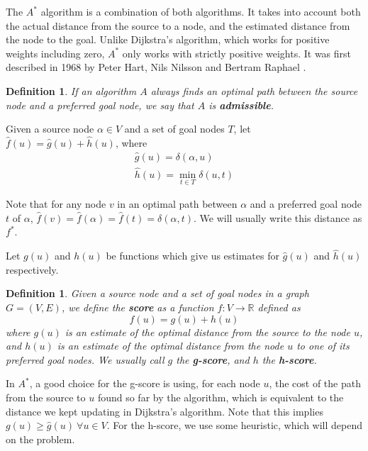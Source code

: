 \documentclass[a4paper,10pt]{report}
\newtheorem{definition}[theorem]{Definition}
\begin{document}
The $A^*$ algorithm is a combination of both algorithms. It takes into account both the actual distance from the source to a node, and the estimated distance from the node to the goal. Unlike Dijkstra's algorithm, which works for positive weights including zero, $A^*$ only works with strictly positive weights. It was first described in 1968 by Peter Hart, Nils Nilsson and Bertram Raphael \cite{hart}.

\begin{definition}
If an algorithm $A$ always finds an optimal path between the source node and a preferred goal node, we say that $A$ is \textbf{admissible}.
\end{definition}

Given a source node $\alpha \in V$ and a set of goal nodes $T$, let $\hat{f}(u) = \hat{g}(u) + \hat{h}(u)$, where 
\begin{align*}
\hat{g}(u) = \delta(\alpha, u)\\
\hat{h}(u) = \min_{t \in T} \delta(u, t)
\end{align*}
 
Note that for any node $v$ in an optimal path between $\alpha$ and a preferred goal node $t$ of $\alpha$, $\hat{f}(v) = \hat{f}(\alpha) = \hat{f}(t) = \delta(\alpha, t)$. We will usually write this distance as $f^*$.

Let $g(u)$ and $h(u)$ be functions which give us estimates for $\hat{g}(u)$ and $\hat{h}(u)$ respectively.

\begin{definition}
Given a source node and a set of goal nodes in a graph $G = (V, E)$, we define the \textbf{score} as a function $f \colon V \to \mathbb{R}$ defined as
\begin{equation}
	f(u) = g(u) + h(u)
\end{equation}
where $g(u)$ is an estimate of the optimal distance from the source to the node $u$, and $h(u)$ is an estimate of the optimal distance from the node $u$ to one of its preferred goal nodes. We usually call $g$ the \textbf{g-score}, and $h$ the \textbf{h-score}.
\end{definition}

In $A^*$, a good choice for the g-score is using, for each node $u$, the cost of the path from the source to $u$ found so far by the algorithm, which is equivalent to the distance we kept updating in Dijkstra's algorithm. Note that this implies $g(u) \geq \hat{g}(u) \ \forall u \in V$. For the h-score, we use some heuristic, which will depend on the problem.
\end{document}

